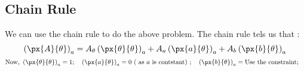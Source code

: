 \subsection{Chain Rule}

We can use the chain rule to do the above problem. 
The chain rule tels us that : 
$$
\left( \px{A}{\theta} \right)_a
    = A_{\theta} \left( \px{\theta}{\theta} \right)_a
    + A_a \left( \px{a}{\theta} \right)_a
    + A_b \left( \px{b}{\theta} \right)_a
$$
$$
\text{Now, }
\left( \px{\theta}{\theta} \right)_a = 1 ; \quad
\left( \px{a}{\theta} \right)_a = 0 \text{ ( as $a$ is contstant) }; \quad
\left( \px{b}{\theta} \right)_a = \text{Use the constraint} ; \quad
$$

